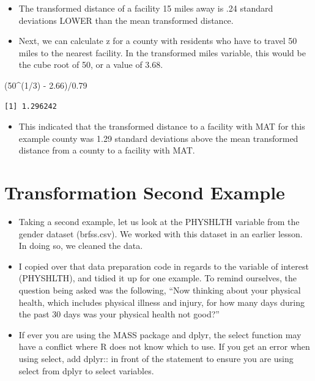 \documentclass[
  letterpaper,
  DIV=11,
  numbers=noendperiod]{scrreprt}
\newenvironment{Shaded}{\begin{snugshade}}{\end{snugshade}}
\newcommand{\DecValTok}[1]{\textcolor[rgb]{0.68,0.00,0.00}{#1}}
\newcommand{\FloatTok}[1]{\textcolor[rgb]{0.68,0.00,0.00}{#1}}
\newcommand{\NormalTok}[1]{\textcolor[rgb]{0.00,0.23,0.31}{#1}}
\newcommand{\SpecialCharTok}[1]{\textcolor[rgb]{0.37,0.37,0.37}{#1}}
\providecommand{\tightlist}{%
  \setlength{\itemsep}{0pt}\setlength{\parskip}{0pt}}\usepackage{longtable,booktabs,array}
\begin{document}
\begin{itemize}
\item
  The transformed distance of a facility 15 miles away is .24 standard
  deviations LOWER than the mean transformed distance.
\item
  Next, we can calculate z for a county with residents who have to
  travel 50 miles to the nearest facility. In the transformed miles
  variable, this would be the cube root of 50, or a value of 3.68.
\end{itemize}

\begin{Shaded}
\begin{Highlighting}[]
\NormalTok{(}\DecValTok{50}\SpecialCharTok{\^{}}\NormalTok{(}\DecValTok{1}\SpecialCharTok{/}\DecValTok{3}\NormalTok{) }\SpecialCharTok{{-}} \FloatTok{2.66}\NormalTok{)}\SpecialCharTok{/}\FloatTok{0.79}
\end{Highlighting}
\end{Shaded}

\begin{verbatim}
[1] 1.296242
\end{verbatim}

\begin{itemize}
\tightlist
\item
  This indicated that the transformed distance to a facility with MAT
  for this example county was 1.29 standard deviations above the mean
  transformed distance from a county to a facility with MAT.
\end{itemize}

\section{Transformation Second
Example}\label{transformation-second-example}

\begin{itemize}
\tightlist
\item
  Taking a second example, let us look at the PHYSHLTH variable from the
  gender dataset (brfss.csv). We worked with this dataset in an earlier
  lesson. In doing so, we cleaned the data.
\item
  I copied over that data preparation code in regards to the variable of
  interest (PHYSHLTH), and tidied it up for one example. To remind
  ourselves, the question being asked was the following, ``Now thinking
  about your physical health, which includes physical illness and
  injury, for how many days during the past 30 days was your physical
  health not good?''
\item
  If ever you are using the MASS package and dplyr, the select function
  may have a conflict where R does not know which to use. If you get an
  error when using select, add dplyr:: in front of the statement to
  ensure you are using select from dplyr to select variables.
\end{itemize}
\end{document}

